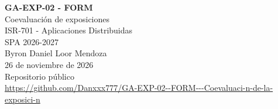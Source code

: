 \documentclass[12pt,a4paper]{article}
\begin{document}
\begin{center}
\vspace*{2cm}
{\Large\bfseries GA-EXP-02 - FORM}\\[1em]
{\Large Coevaluación de exposiciones}\\[2em]
ISR-701 - Aplicaciones Distribuidas\\[0.7em]
SPA 2026-2027\\[2em]
Byron Daniel Loor Mendoza\\[1em]
26 de noviembre de 2026\\[3em]
Repositorio público\\[1em]
{\scriptsize\mbox{\url{https://github.com/Danxxx777/GA-EXP-02--FORM---Coevaluaci-n-de-la-exposici-n}}}
\end{center}
\end{document}
